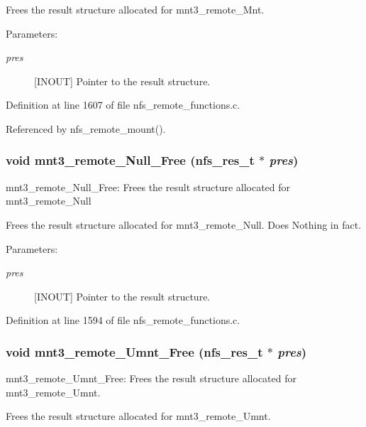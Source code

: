 Frees the result structure allocated for mnt3\_\-remote\_\-Mnt.

\begin{Desc}
\item[Parameters:]
\begin{description}
\item[{\em pres}][INOUT] Pointer to the result structure. \end{description}
\end{Desc}


Definition at line 1607 of file nfs\_\-remote\_\-functions.c.

Referenced by nfs\_\-remote\_\-mount().
\subsubsection{\setlength{\rightskip}{0pt plus 5cm}void mnt3\_\-remote\_\-Null\_\-Free (nfs\_\-res\_\-t $\ast$ {\em pres})}\label{group__NFSprocs_ga51}


mnt3\_\-remote\_\-Null\_\-Free: Frees the result structure allocated for mnt3\_\-remote\_\-Null

Frees the result structure allocated for mnt3\_\-remote\_\-Null. Does Nothing in fact.

\begin{Desc}
\item[Parameters:]
\begin{description}
\item[{\em pres}][INOUT] Pointer to the result structure. \end{description}
\end{Desc}


Definition at line 1594 of file nfs\_\-remote\_\-functions.c.
\subsubsection{\setlength{\rightskip}{0pt plus 5cm}void mnt3\_\-remote\_\-Umnt\_\-Free (nfs\_\-res\_\-t $\ast$ {\em pres})}\label{group__NFSprocs_ga52}


mnt3\_\-remote\_\-Umnt\_\-Free: Frees the result structure allocated for mnt3\_\-remote\_\-Umnt.

Frees the result structure allocated for mnt3\_\-remote\_\-Umnt.

